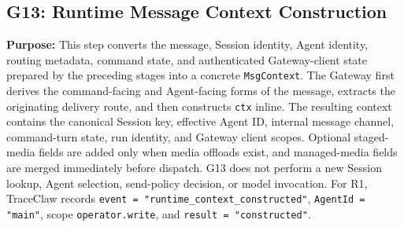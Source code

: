 \subsection*{G13: Runtime Message Context Construction}

\textbf{Purpose:}
This step converts the message, Session identity, Agent identity,
routing metadata, command state, and authenticated Gateway-client
state prepared by the preceding stages into a concrete
\texttt{MsgContext}. The Gateway first derives the command-facing and
Agent-facing forms of the message, extracts the originating delivery
route, and then constructs \texttt{ctx} inline. The resulting context
contains the canonical Session key, effective Agent ID, internal
message channel, command-turn state, run identity, and Gateway client
scopes. Optional staged-media fields are added only when media
offloads exist, and managed-media fields are merged immediately before
dispatch. G13 does not perform a new Session lookup, Agent selection,
send-policy decision, or model invocation. For R1, TraceClaw records
\texttt{event = "runtime\_context\_constructed"},
\texttt{AgentId = "main"}, scope \texttt{operator.write}, and
\texttt{result = "constructed"}.

